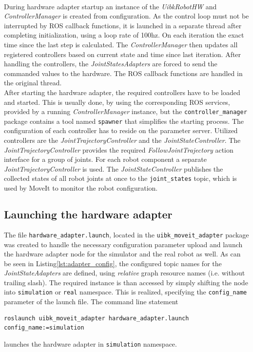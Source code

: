 \begin{minipage}{\linewidth}

\end{minipage} \\

During hardware adapter startup an instance of the \emph{UibkRobotHW} and \emph{ControllerManager} is created from configuration. As the control loop must not be interrupted by ROS callback functions, it is launched in a separate thread after completing initialization, using a loop rate of 100hz. On each iteration the exact time since the last step is calculated. The \emph{ControllerManager} then updates all registered controllers based on current state and time since last iteration. After handling the controllers, the \emph{JointStatesAdapters} are forced to send the commanded values to the hardware. The ROS callback functions are handled in the original thread.\\

After starting the hardware adapter, the required controllers have to be loaded and started. This is usually done, by using the corresponding ROS services, provided by a running \emph{ControllerManager} instance, but the \texttt{controller\_manager} package contains a tool named \texttt{spawner} that simplifies the starting process. The configuration of each controller has to reside on the parameter server. Utilized controllers are the \emph{JointTrajectoryController} and the \emph{JointStateController}. The \emph{JointTrajectoryController} provides the required \emph{FollowJointTrajectory} action interface for a group of joints. For each robot component a separate \emph{JointTrajectoryController} is used. The \emph{JointStateController} publishes the collected states of all robot joints at once to the \texttt{joint\_states} topic, which is used by MoveIt to monitor the robot configuration.

\subsection{Launching the hardware adapter}

The file \texttt{hardware\_adapter.launch}, located in the \texttt{uibk\_moveit\_adapter} package was created to handle the necessary configuration parameter upload and launch the hardware adapter node for the simulator and the real robot as well. As can be seen in Listing\ref{lst:adapter_config}, the configured topic names for the \emph{JointStateAdapters} are defined, using \emph{relative} graph resource names (i.e. without trailing slash). The required instance is than accessed by simply shifting the node into \texttt{simulation} or \texttt{real} namespace. This is realized, specifying the \texttt{config\_name} parameter of the launch file. The command line statement
\begin{verbatim}
roslaunch uibk_moveit_adapter hardware_adapter.launch config_name:=simulation
\end{verbatim}
launches the hardware adapter in \texttt{simulation} namespace.\\

